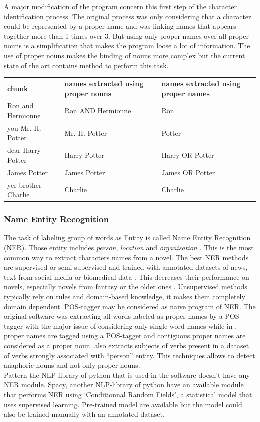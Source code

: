 \documentclass[a4paper, 12pt]{report}
\begin{document}
A major modification of the program concern this first step of the character identification process. The original process was only considering that a character could be represented by a proper name and was linking names that appears together more than 1 times over 3. But using only proper names over all proper nouns is a simplification that makes the program loose a lot of information. The use of proper nouns makes the binding of nouns more complex but the current state of the art contains method to perform this task. \\
 
 \begin{tabular}{lll}
\textbf{chunk} & \textbf{names extracted using proper nouns} &  \textbf{names extracted using proper names} \\
   Ron and Hermionne & Ron AND Hermionne & Ron\\
   you Mr. H. Potter & Mr. H. Potter &  Potter\\
   dear Harry Potter & Harry Potter & Harry OR Potter \\
   James Potter& James Potter & James OR Potter \\
   yer brother Charlie & Charlie & Charlie\\
\end{tabular}

\subsubsection{Name Entity Recognition}
The task of labeling group of words as Entity is called Name Entity Recognition (NER). Those entity includes \textit{person}, \textit{location} and \textit{organisation} \citep{libraries}. This is the most common way to extract characters names from a novel.
The best NER methods are supervised or semi-supervised and trained with annotated datasets of news, text from social media or biomedical data \citep{NER_survey_recent}. This decreases their performance on novels, especially novels from fantasy or the older ones \citep{NER}.  Unsupervised methods typically rely on rules and domain-based knowledge, it makes them completely domain dependent. POS-tagger may be considered as naive program of NER. The original software \citep{original} was extracting all words labeled as proper names by a POS-tagger with the major issue of considering only single-word names while in \cite{quoted}, proper names are tagged using a POS-tagger and contiguous proper names are considered as a proper noun. \cite{character_meta} also extracts subjects of verbs present in a dataset of verbs strongly associated with ``person'' entity. This techniques allows to detect anaphoric nouns and not only proper nouns. \\
Pattern the NLP  library of python that is used in the software doesn't have any NER module. Spacy, another NLP-library of python have an available module that performs NER using `Conditionnal Random Fields', a statistical model that uses supervised learning. Pre-trained model are available but the model could also be trained manually with an annotated dataset.
\end{document}
